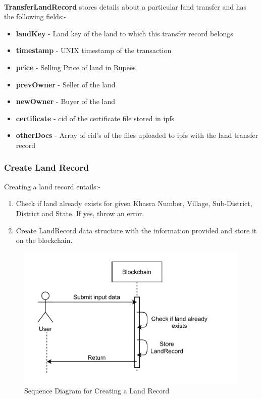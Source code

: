 \documentclass[12pt]{article}
\begin{document}
        \paragraph{}
        \textbf{TransferLandRecord} stores details about a particular land transfer and has the following fields:-
        \begin{itemize}
            \item \textbf{landKey} - Land key of the land to which this transfer record belongs
            \item \textbf{timestamp} - UNIX timestamp of the transaction
            \item \textbf{price} - Selling Price of land in Rupees
            \item \textbf{prevOwner} - Seller of the land
            \item \textbf{newOwner} - Buyer of the land
            \item \textbf{certificate} - \acrshort{cid} of the certificate file stored in \acrshort{ipfs}
            \item \textbf{otherDocs} - Array of \acrshort{cid}'s of the files uploaded to \acrshort{ipfs} with the land transfer record
        \end{itemize}

    \subsubsection{Create Land Record}
        Creating a land record entails:-
        \begin{enumerate}
            \item Check if land already exists for given Khasra Number, Village, Sub-District, District and State. If yes, throw an error.
            \item Create LandRecord data structure with the information provided and store it on the blockchain.
        \end{enumerate}

        \begin{figure}[htbp]
            \includegraphics[scale=0.25]{blockchain_seq_create_land}
            \centering
            \caption{Sequence Diagram for Creating a Land Record}
        \end{figure}
\end{document}
